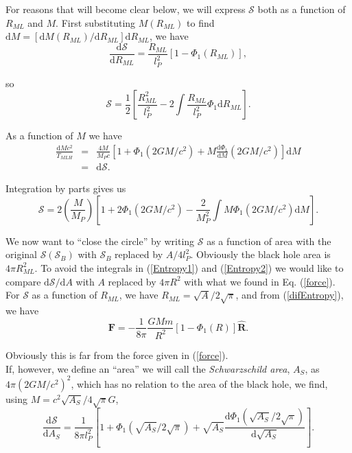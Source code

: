 \documentclass[nofootinbib,aps,prd,preprint,groupedaddress,showpacs,showkeys]{revtex4-1}
\newcommand{\dif}{\mathrm{d}}
\begin{document}
\noindent For reasons that will become clear below, we will express $\mathcal{S}$ both as a function of $R_{ML}$ and $M$. First substituting $M(R_{ML})$ to find $\dif M = [\dif M (R_{ML})/\dif R_{ML}] \dif R_{ML}$, we have
\begin{equation}
\frac{\dif \mathcal{S}}{\dif R_{ML}} = \frac{R_{ML}}{l_P^2} [1 - \Phi_1(R_{ML})], \label{difEntropy}
\end{equation}

\noindent so
\begin{equation}
\mathcal{S} = \frac{1}{2} \left[\frac{R_{ML}^2}{l_P^2} - 2 \int \frac{R_{ML}}{l_P^2} \Phi_1 \dif R_{ML} \right]. \label{Entropy1}
\end{equation}

\noindent As a function of $M$ we have
\begin{eqnarray}
\frac{\dif M c^2}{T_{MLH}} &=& \frac{4M}{M_P c} \left[1 + \Phi_1(2GM/c^2) + M \frac{\dif \Phi_1}{\dif M}(2GM/c^2)\right] \dif M \nonumber \\
&=& \dif \mathcal{S}.
\end{eqnarray}

\noindent Integration by parts gives us
\begin{equation}
\mathcal{S} = 2 \left(\frac{M}{M_P}\right) \left[1 + 2\Phi_1(2GM/c^2) -\frac{2}{M_P^2} \int M \Phi_1 (2GM/c^2) \dif M \right]. \label{Entropy2}
\end{equation}

\noindent We now want to ``close the circle'' by writing $\mathcal{S}$ as a function of area with the original $\mathcal{S} (\mathcal{S}_B)$ with $\mathcal{S}_B$ replaced by $A/4 l_P^2$. Obviously the black hole area is $4 \pi R_{ML}^2$. To avoid the integrals in (\ref{Entropy1}) and (\ref{Entropy2}) we would like to compare $\dif \mathcal{S} / \dif A$ with $A$ replaced by $4 \pi R^2$ with what we found in Eq. (\ref{force}). For $\mathcal{S}$ as a function of $R_{ML}$, we have $R_{ML} = \sqrt{A}/2\sqrt{\pi}$, and from (\ref{difEntropy}), we have
\begin{equation}
\mathbf{F} = -\frac{1}{8 \pi} \frac{GMm}{R^2} [1 - \Phi_1(R)] \hat{\mathbf{R}}.
\end{equation}

\noindent Obviously this is far from the force given in (\ref{force}).\\
\indent If, however, we define an ``area'' we will call the \textit{Schwarzschild area}, $A_S$, as $4 \pi(2GM/c^2)^2$, which has no relation to the area of the black hole, we find, using $M = c^2 \sqrt{A_S}/4\sqrt{\pi} G$,
\begin{equation}
\frac{\dif \mathcal{S}}{\dif A_S} = \frac{1}{8 \pi l_P^2} \left[1 + \Phi_1(\sqrt{A_S}/2\sqrt{\pi}) + \sqrt{A_S} \frac{\dif \Phi_1 (\sqrt{A_S}/2 \sqrt{\pi})}{\dif \sqrt{A_S}} \right].
\end{equation}
\end{document}
